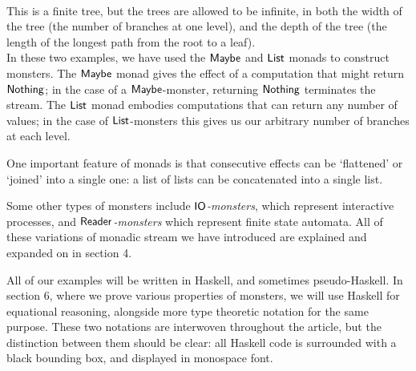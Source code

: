  \\

This is a finite tree, but the trees are allowed to be infinite, in both the width of the tree (the number of branches at one level), and the depth of the tree (the length of the longest path from the root to a leaf). \\

In these two examples, we have used the $\mathsf{Maybe}$ and $\mathsf{List}$ monads to construct monsters.
The $\mathsf{Maybe}$ monad gives the effect of a computation that might return $\mathsf{Nothing}$; in the case of a $\mathsf{Maybe}$-monster, returning $\mathsf{Nothing}$ terminates the stream. 
The $\mathsf{List}$ monad embodies computations that can return any number of values; in the case of $\mathsf{List}$-monsters this gives us our arbitrary number of branches at each level.

One important feature of monads is that consecutive effects can be `flattened' or `joined' into a single one: a list of lists can be concatenated into a single list. 

Some other types of monsters include \emph{$\mathsf{IO}$-monsters}, which represent interactive processes, and \emph{$\mathsf{Reader}$-monsters} which represent finite state automata. All of these variations of monadic stream we have introduced are explained and expanded on in section 4.

All of our examples will be written in Haskell, and sometimes pseudo-Haskell. In section 6, where we prove various properties of monsters, we will use Haskell for equational reasoning, alongside more type theoretic notation for the same purpose. These two notations are interwoven throughout the article, but the distinction between them should be clear: all Haskell code is surrounded with a black bounding box, and displayed in monospace font. \\

